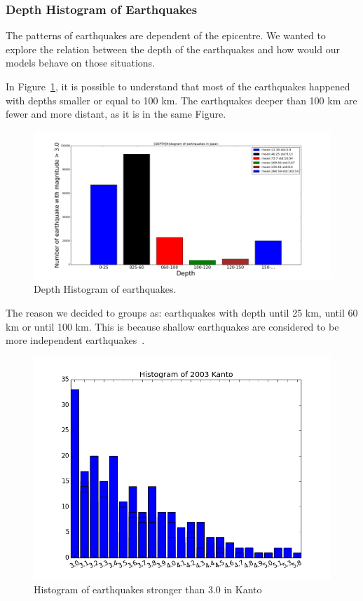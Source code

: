 \subsubsection{Depth Histogram of Earthquakes}


The patterns of earthquakes are dependent of the epicentre. We wanted
to explore the relation between the depth of the earthquakes and how
would our models behave on those situations.

In Figure~\ref{histogramQuakes}, it is possible to understand that
most of the earthquakes happened with depths smaller or equal to 100
km. The earthquakes deeper than 100 km are fewer and more distant, as
it is in the same Figure.\\

\begin{figure}[]
	\centering
	\includegraphics[scale=0.15]{img/detphsNew.png}
	\caption{Depth Histogram of earthquakes.}
	\label{histogramQuakes}
\end{figure}

The reason we decided to groups as: earthquakes with depth until 25
km, until 60 km or until 100 km. This is because shallow earthquakes
are considered to be more independent
earthquakes~\cite{yamanaka1990scaling}.

\begin{figure}
	\centering
	\includegraphics[scale=0.35]{img/Magnitude2003Kanto.png}
	\caption{Histogram of earthquakes stronger than 3.0 in Kanto}
	\label{quakesKanto}
\end{figure}
